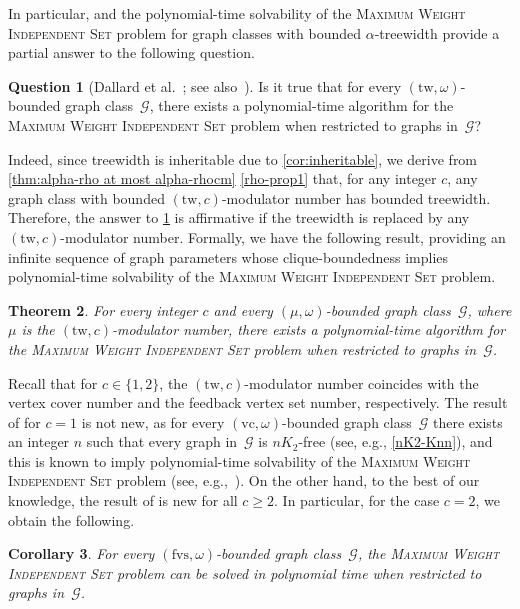 \documentclass[11pt]{article}
\newcommand{\tw}{\mathrm{tw}}
\newcommand{\fvs}{\mathrm{fvs}}
\newcommand{\vc}{\mathrm{vc}}
\theoremstyle{plain}
\newtheorem{theorem}{Theorem}[section]
\newtheorem{corollary}[theorem]{Corollary}
\theoremstyle{definition}
\newtheorem{question}[theorem]{Question}
\theoremstyle{remark}
\numberwithin{equation}{section}
\begin{document}
In particular,  and the polynomial-time solvability of the \textsc{Maximum Weight Independent Set} problem for graph classes with bounded $\alpha$-treewidth provide a partial answer to the following question.
\begin{question}[Dallard et al.~{\cite[Question 8.3]{dallard2022secondpaper}}; see also~{\cite[Question 9.8]
{MR4334541}}]
\label{question:alpha-easy}
Is it true that for every $(\tw,\omega)$-bounded graph class~$\mathcal{G}$, there exists a polynomial-time algorithm for the \textsc{Maximum Weight Independent Set} problem when restricted to graphs in~$\mathcal{G}$?
\end{question}

\noindent
Indeed, since treewidth is inheritable due to \cref{cor:inheritable}, we derive from \cref{thm:alpha-rho at most alpha-rhocm} \ref{rho-prop1} that, for any integer $c$, any graph class with bounded $(\tw,c)$-modulator number has bounded treewidth. Therefore, 
the answer to \cref{question:alpha-easy} is affirmative if the treewidth is replaced by any $(\tw,c)$-modulator number. 
Formally, we have the following result, providing an infinite sequence of graph parameters whose clique-boundedness implies polynomial-time solvability of the \textsc{Maximum Weight Independent Set} problem.

\begin{theorem}\label{thm:MWIS}
For every integer $c$ and every $(\mu,\omega)$-bounded graph class~$\mathcal{G}$, where $\mu$ is the $(\tw,c)$-modulator number, there exists a polynomial-time algorithm for the \textsc{Maximum Weight Independent Set} problem when restricted to graphs in~$\mathcal{G}$.
\end{theorem}

Recall that for $c\in \{1,2\}$, the $(\tw,c)$-modulator number coincides with the vertex cover number and the feedback vertex set number, respectively.
The result of  for $c = 1$ is not new, as for every $(\vc,\omega)$-bounded graph class~$\mathcal{G}$ there exists an integer $n$ such that every graph in~$\mathcal{G}$ is $nK_2$-free (see, e.g., \cref{nK2-Knn}), and this is known to imply polynomial-time solvability of the \textsc{Maximum Weight Independent Set} problem (see, e.g.,~\cite{MR3695266}).
On the other hand, to the best of our knowledge, the result of  is new for all $c\ge 2$.
In particular, for the case $c = 2$, we obtain the following.

\begin{corollary}\label{cor:fvs}
For every $(\fvs,\omega)$-bounded graph class~$\mathcal{G}$, the \textsc{Maximum Weight Independent Set} problem can be solved in polynomial time when restricted to graphs in~$\mathcal{G}$.
\end{corollary}
\end{document}
